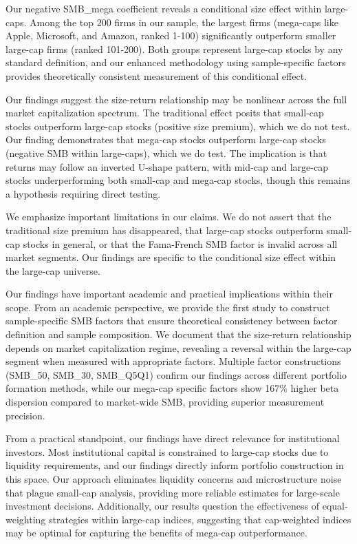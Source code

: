 \documentclass[10pt,letterpaper]{article}
\begin{document}
Our negative SMB\_mega coefficient reveals a conditional size effect within large-caps. Among the top 200 firms in our sample, the largest firms (mega-caps like Apple, Microsoft, and Amazon, ranked 1-100) significantly outperform smaller large-cap firms (ranked 101-200). Both groups represent large-cap stocks by any standard definition, and our enhanced methodology using sample-specific factors provides theoretically consistent measurement of this conditional effect.

Our findings suggest the size-return relationship may be nonlinear across the full market capitalization spectrum. The traditional effect posits that small-cap stocks outperform large-cap stocks (positive size premium), which we do not test. Our finding demonstrates that mega-cap stocks outperform large-cap stocks (negative SMB within large-caps), which we do test. The implication is that returns may follow an inverted U-shape pattern, with mid-cap and large-cap stocks underperforming both small-cap and mega-cap stocks, though this remains a hypothesis requiring direct testing.

We emphasize important limitations in our claims. We do not assert that the traditional size premium has disappeared, that large-cap stocks outperform small-cap stocks in general, or that the Fama-French SMB factor is invalid across all market segments. Our findings are specific to the conditional size effect within the large-cap universe.

Our findings have important academic and practical implications within their scope. From an academic perspective, we provide the first study to construct sample-specific SMB factors that ensure theoretical consistency between factor definition and sample composition. We document that the size-return relationship depends on market capitalization regime, revealing a reversal within the large-cap segment when measured with appropriate factors. Multiple factor constructions (SMB\_50, SMB\_30, SMB\_Q5Q1) confirm our findings across different portfolio formation methods, while our mega-cap specific factors show 167\% higher beta dispersion compared to market-wide SMB, providing superior measurement precision.

From a practical standpoint, our findings have direct relevance for institutional investors. Most institutional capital is constrained to large-cap stocks due to liquidity requirements, and our findings directly inform portfolio construction in this space. Our approach eliminates liquidity concerns and microstructure noise that plague small-cap analysis, providing more reliable estimates for large-scale investment decisions. Additionally, our results question the effectiveness of equal-weighting strategies within large-cap indices, suggesting that cap-weighted indices may be optimal for capturing the benefits of mega-cap outperformance.
\end{document}
